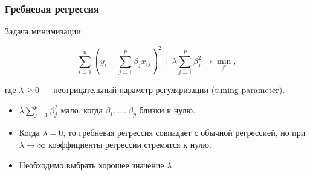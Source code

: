 \documentclass[unicode, notheorems]{beamer}
\begin{document}
\begin{frame}
\frametitle{Гребневая регрессия}

Задача минимизации:

\[\sum_{i=1}^n(y_i - \sum_{j=1}^p \beta_j x_{ij})^2  + \lambda \sum_{j = 1}^p \beta_j^2 \rightarrow \min_{\beta},\]

где $\lambda \geq 0$ --- неотрицательный параметр регуляризации (tuning parameter).

\begin{itemize}
\item $\lambda\sum_{j = 1}^p \beta_j^2$ мало, когда $\beta_1, \ldots, \beta_p$ близки к нулю.
\item Когда $\lambda = 0$, то гребневая регрессия совпадает с обычной регрессией, но при $\lambda \rightarrow \infty$ коэффициенты регрессии стремятся к нулю.

\item Необходимо выбрать хорошее значение $\lambda$.
\end{itemize}


\end{frame}
\end{document}
